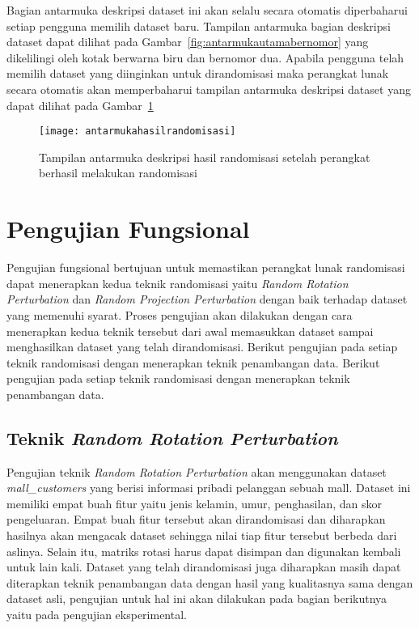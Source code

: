 Bagian antarmuka deskripsi dataset ini akan selalu secara otomatis diperbaharui setiap pengguna memilih dataset baru. Tampilan antarmuka bagian deskripsi dataset dapat dilihat pada Gambar~\ref{fig:antarmukautamabernomor} yang dikelilingi oleh kotak berwarna biru dan bernomor dua. Apabila pengguna telah memilih dataset yang diinginkan untuk dirandomisasi maka perangkat lunak secara otomatis akan memperbaharui tampilan antarmuka deskripsi dataset yang dapat dilihat pada Gambar~\ref{fig:antarmukahasilrandomisasi}

\begin{figure}
	\centering
	\texttt{[image: antarmukahasilrandomisasi]}
	\caption{Tampilan antarmuka deskripsi hasil randomisasi setelah perangkat berhasil melakukan randomisasi}
	\label{fig:antarmukahasilrandomisasi}
\end{figure}

\section{Pengujian Fungsional}
\label{sec:pengujianfungsional}

Pengujian fungsional bertujuan untuk memastikan perangkat lunak randomisasi dapat menerapkan kedua teknik randomisasi yaitu \textit{Random Rotation Perturbation} dan \textit{Random Projection Perturbation} dengan baik terhadap dataset yang memenuhi syarat. Proses pengujian akan dilakukan dengan cara menerapkan kedua teknik tersebut dari awal memasukkan dataset sampai menghasilkan dataset yang telah dirandomisasi. Berikut pengujian pada setiap teknik randomisasi dengan menerapkan teknik penambangan data. Berikut pengujian pada setiap teknik randomisasi dengan menerapkan teknik penambangan data.

\subsection{Teknik \textit{Random Rotation Perturbation}}
\label{sec:rrp-fungsional}

Pengujian teknik \textit{Random Rotation Perturbation} akan menggunakan dataset \textit{mall\_customers} yang berisi informasi pribadi pelanggan sebuah mall. Dataset ini memiliki empat buah fitur yaitu jenis kelamin, umur, penghasilan, dan skor pengeluaran. Empat buah fitur tersebut akan dirandomisasi dan diharapkan hasilnya akan mengacak dataset sehingga nilai tiap fitur tersebut berbeda dari aslinya. Selain itu, matriks rotasi harus dapat disimpan dan digunakan kembali untuk lain kali. Dataset yang telah dirandomisasi juga diharapkan masih dapat diterapkan teknik penambangan data dengan hasil yang kualitasnya sama dengan dataset asli, pengujian untuk hal ini akan dilakukan pada bagian berikutnya yaitu pada pengujian eksperimental.

